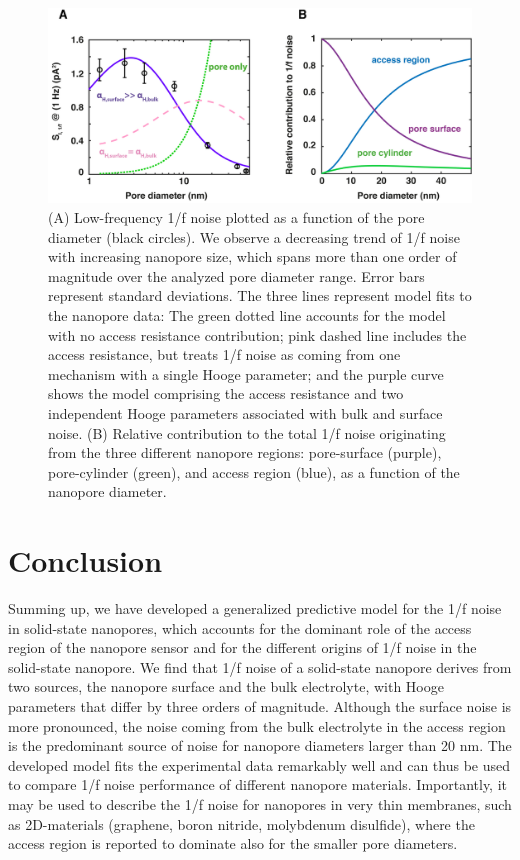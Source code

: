 	\begin{figure}
		\includegraphics[width=\linewidth]{figures/Figure2.3.png}
		\caption{(A) Low-frequency 1/f noise plotted as a function of the pore diameter (black circles). We observe a decreasing trend of 1/f noise with increasing nanopore size, which spans more than one order of magnitude over the analyzed pore diameter range. Error bars represent standard deviations. The three lines represent model fits to the nanopore data: The green dotted line accounts for the model with no access resistance contribution; pink dashed line includes the access resistance, but treats 1/f noise as coming from one mechanism with a single Hooge parameter; and the purple curve shows the model comprising the access resistance and two independent Hooge parameters associated with bulk and surface noise. (B) Relative contribution to the total 1/f noise originating from the three different nanopore regions: pore-surface (purple), pore-cylinder (green), and access region (blue), as a function of the nanopore diameter.}
		\label{fig:model}
	\end{figure}





\section{Conclusion}


Summing up, we have developed a generalized predictive model for the 1/f noise in solid-state nanopores, which accounts for the dominant role of the access region of the nanopore sensor and for the different origins of 1/f noise in the solid-state nanopore. We find that 1/f noise of a solid-state nanopore derives from two sources, the nanopore surface and the bulk electrolyte, with Hooge parameters that differ by three orders of magnitude. Although the surface noise is more pronounced, the noise coming from the bulk electrolyte in the access region is the predominant source of noise for nanopore diameters larger than 20 nm. The developed model fits the experimental data remarkably well and can thus be used to compare 1/f noise performance of different nanopore materials. Importantly, it may be used to describe the 1/f noise for nanopores in very thin membranes, such as 2D-materials (graphene, boron nitride, molybdenum disulfide), where the access region is reported to dominate also for the smaller pore diameters.


